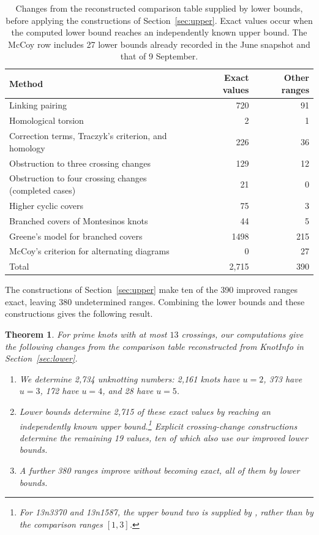 \documentclass[12pt, oneside]{amsart}
\newtheorem{theorem}{Theorem}[section]
\newcommand{\KI}{\textsf{KnotInfo}}
\newcommand{\kn}[2]{\textup{#1#2}}
\newcommand{\nExactUpper}{19}
\newcommand{\nLowerImproved}{390}
\newcommand{\nExact}{2{,}734}
\newcommand{\nExactLower}{2{,}715}
\newcommand{\nImproved}{380}
\newcommand{\nMcCoyKnots}{27}
\newcommand{\nUfive}{28}
\newcommand{\nUfour}{172}
\newcommand{\nUthree}{373}
\newcommand{\nUtwo}{2{,}161}
\begin{document}
\begin{table}[htbp]
\centering
\small
\caption{Changes from the reconstructed comparison table supplied by lower
bounds, before applying the constructions of Section~\ref{sec:upper}.
Exact values occur when the computed lower bound reaches an
independently known upper bound. The McCoy row includes \nMcCoyKnots{} lower
bounds already recorded in the June snapshot and that of 9 September.}\label{tab:lower-summary}
\begin{tabular}{@{}p{9.3cm}rr@{}}
\toprule
Method & Exact values & Other ranges\\
\midrule
Linking pairing & 720 & 91 \\
Homological torsion & 2 & 1 \\
Correction terms, Traczyk's criterion, and homology & 226 & 36 \\
Obstruction to three crossing changes & 129 & 12 \\
Obstruction to four crossing changes (completed cases) & 21 & 0 \\
Higher cyclic covers & 75 & 3 \\
Branched covers of Montesinos knots & 44 & 5 \\
Greene's model for branched covers & 1498 & 215 \\
McCoy's criterion for alternating diagrams & 0 & 27 \\
\midrule
Total & \nExactLower{} & \nLowerImproved{}\\
\bottomrule
\end{tabular}
\end{table}

The constructions of Section~\ref{sec:upper} make ten of the
\nLowerImproved{} improved ranges exact, leaving \nImproved{} undetermined
ranges. Combining the lower bounds and these constructions gives the
following result.

\begin{samepage}
\begin{theorem}\label{thm:main}
For prime knots with at most $13$ crossings, our computations give the following
changes from the comparison table reconstructed from \KI{} in
Section~\ref{sec:lower}.
\begin{enumerate}
\item[(i)] We determine \nExact{} unknotting numbers: \nUtwo{} knots have $u=2$,
\nUthree{} have $u=3$, \nUfour{} have $u=4$, and \nUfive{} have $u=5$.
\item[(ii)] Lower bounds determine \nExactLower{} of these exact values by reaching
an independently known upper bound.\footnote{For \kn{13n}{3370} and
\kn{13n}{1587}, the upper bound two is supplied by \cite[Thm.~1.3(a) and
\S3]{BH1705}, rather than by the comparison ranges $[1,3]$.} Explicit
crossing-change constructions determine the remaining \nExactUpper{} values,
ten of which also use our improved lower bounds.
\item[(iii)] A further \nImproved{} ranges improve without becoming exact, all of
them by lower bounds.
\end{enumerate}
\end{theorem}
\end{samepage}
\end{document}
